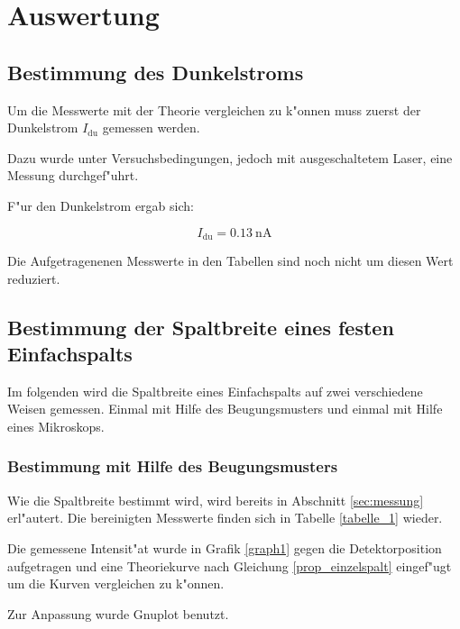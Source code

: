 \section{Auswertung}
	\label{sec:Auswertung}

	\subsection{Bestimmung des Dunkelstroms}
		\label{sub:bestimmung_des_dunkelstroms}
		
		Um die Messwerte mit der Theorie vergleichen zu k"onnen muss zuerst der Dunkelstrom $I_\mathrm{du}$ gemessen werden.

		Dazu wurde unter Versuchsbedingungen, jedoch mit ausgeschaltetem Laser, eine Messung durchgef"uhrt.

		F"ur den Dunkelstrom ergab sich:

		\begin{equation}
			I_\mathrm{du} = \SI{0.13}{\nano \ampere}
		\end{equation}

		Die Aufgetragenenen Messwerte in den Tabellen sind noch nicht um diesen Wert reduziert.

	\subsection{Bestimmung der Spaltbreite eines festen Einfachspalts}
		\label{sub:bestimmung_der_spaltbreite_eines_festen_einfachspalts}
		
		Im folgenden wird die Spaltbreite eines Einfachspalts auf zwei verschiedene Weisen gemessen. Einmal mit Hilfe des Beugungsmusters und einmal mit Hilfe eines Mikroskops.

		\subsubsection{Bestimmung mit Hilfe des Beugungsmusters}
			\label{sub:Bestimmung_mit_Hilfe_des_Beugungsmusters}

			Wie die Spaltbreite bestimmt wird, wird bereits in Abschnitt \ref{sec:messung} erl"autert. Die bereinigten Messwerte finden sich in Tabelle \ref{tabelle_1} wieder.

			Die gemessene Intensit"at wurde in Grafik \ref{graph1} gegen die Detektorposition aufgetragen und eine Theoriekurve nach Gleichung \eqref{prop_einzelspalt} eingef"ugt um die Kurven vergleichen zu k"onnen.

			Zur Anpassung wurde Gnuplot benutzt.

